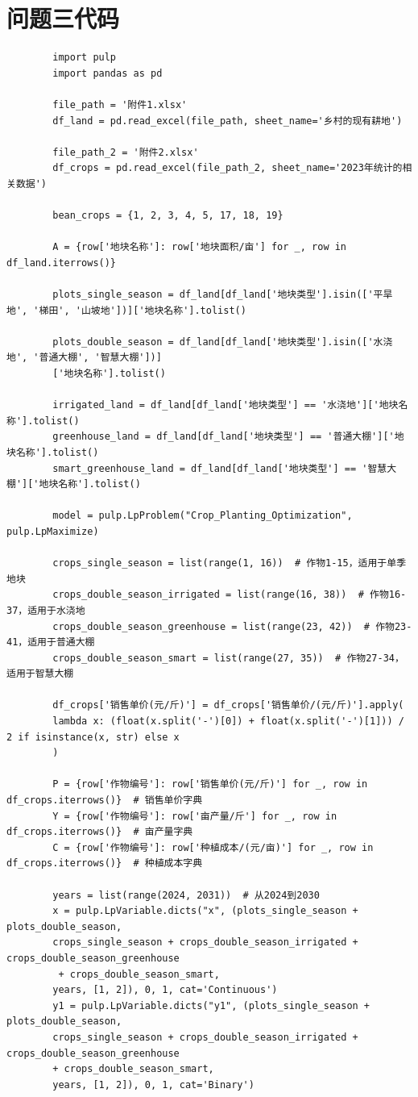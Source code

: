 \documentclass[12pt]{ctexart}
\begin{document}
	\section{问题三代码}
	\begin{verbatim}
		import pulp
		import pandas as pd
		
		file_path = '附件1.xlsx'
		df_land = pd.read_excel(file_path, sheet_name='乡村的现有耕地')
		
		file_path_2 = '附件2.xlsx' 
		df_crops = pd.read_excel(file_path_2, sheet_name='2023年统计的相关数据')
		
		bean_crops = {1, 2, 3, 4, 5, 17, 18, 19}
		
		A = {row['地块名称']: row['地块面积/亩'] for _, row in df_land.iterrows()}
		
		plots_single_season = df_land[df_land['地块类型'].isin(['平旱地', '梯田', '山坡地'])]['地块名称'].tolist()
		
		plots_double_season = df_land[df_land['地块类型'].isin(['水浇地', '普通大棚', '智慧大棚'])]
		['地块名称'].tolist()
		
		irrigated_land = df_land[df_land['地块类型'] == '水浇地']['地块名称'].tolist()
		greenhouse_land = df_land[df_land['地块类型'] == '普通大棚']['地块名称'].tolist()
		smart_greenhouse_land = df_land[df_land['地块类型'] == '智慧大棚']['地块名称'].tolist()
		
		model = pulp.LpProblem("Crop_Planting_Optimization", pulp.LpMaximize)
		
		crops_single_season = list(range(1, 16))  # 作物1-15，适用于单季地块
		crops_double_season_irrigated = list(range(16, 38))  # 作物16-37，适用于水浇地
		crops_double_season_greenhouse = list(range(23, 42))  # 作物23-41，适用于普通大棚
		crops_double_season_smart = list(range(27, 35))  # 作物27-34，适用于智慧大棚
		
		df_crops['销售单价(元/斤)'] = df_crops['销售单价/(元/斤)'].apply(
		lambda x: (float(x.split('-')[0]) + float(x.split('-')[1])) / 2 if isinstance(x, str) else x
		)
		
		P = {row['作物编号']: row['销售单价(元/斤)'] for _, row in df_crops.iterrows()}  # 销售单价字典
		Y = {row['作物编号']: row['亩产量/斤'] for _, row in df_crops.iterrows()}  # 亩产量字典
		C = {row['作物编号']: row['种植成本/(元/亩)'] for _, row in df_crops.iterrows()}  # 种植成本字典
		
		years = list(range(2024, 2031))  # 从2024到2030
		x = pulp.LpVariable.dicts("x", (plots_single_season + plots_double_season,
		crops_single_season + crops_double_season_irrigated + crops_double_season_greenhouse
		 + crops_double_season_smart,
		years, [1, 2]), 0, 1, cat='Continuous')
		y1 = pulp.LpVariable.dicts("y1", (plots_single_season + plots_double_season,
		crops_single_season + crops_double_season_irrigated + crops_double_season_greenhouse 
		+ crops_double_season_smart,
		years, [1, 2]), 0, 1, cat='Binary')
		

\end{verbatim}
\end{document}
